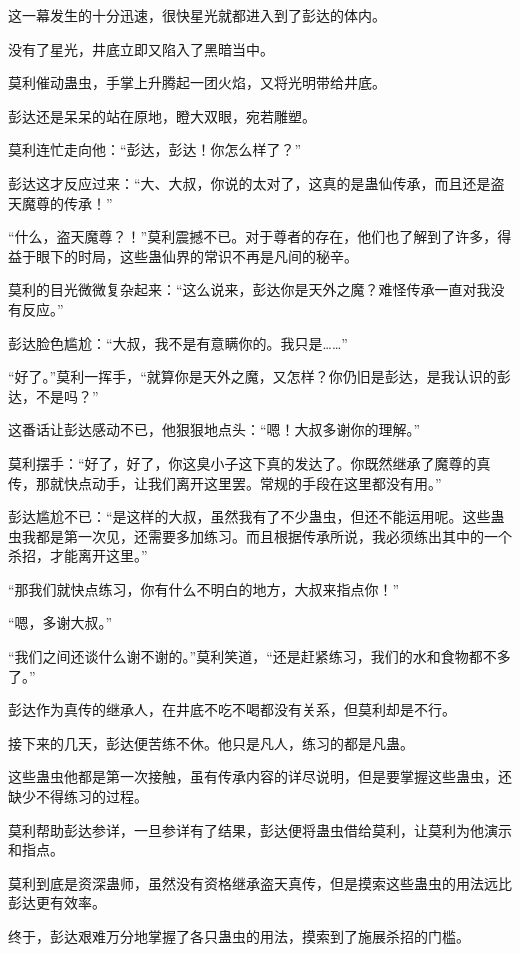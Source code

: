 \begin{this_body}
这一幕发生的十分迅速，很快星光就都进入到了彭达的体内。

没有了星光，井底立即又陷入了黑暗当中。

莫利催动蛊虫，手掌上升腾起一团火焰，又将光明带给井底。

彭达还是呆呆的站在原地，瞪大双眼，宛若雕塑。

莫利连忙走向他：“彭达，彭达！你怎么样了？”

彭达这才反应过来：“大、大叔，你说的太对了，这真的是蛊仙传承，而且还是盗天魔尊的传承！”

“什么，盗天魔尊？！”莫利震撼不已。对于尊者的存在，他们也了解到了许多，得益于眼下的时局，这些蛊仙界的常识不再是凡间的秘辛。

莫利的目光微微复杂起来：“这么说来，彭达你是天外之魔？难怪传承一直对我没有反应。”

彭达脸色尴尬：“大叔，我不是有意瞒你的。我只是……”

“好了。”莫利一挥手，“就算你是天外之魔，又怎样？你仍旧是彭达，是我认识的彭达，不是吗？”

这番话让彭达感动不已，他狠狠地点头：“嗯！大叔多谢你的理解。”

莫利摆手：“好了，好了，你这臭小子这下真的发达了。你既然继承了魔尊的真传，那就快点动手，让我们离开这里罢。常规的手段在这里都没有用。”

彭达尴尬不已：“是这样的大叔，虽然我有了不少蛊虫，但还不能运用呢。这些蛊虫我都是第一次见，还需要多加练习。而且根据传承所说，我必须练出其中的一个杀招，才能离开这里。”

“那我们就快点练习，你有什么不明白的地方，大叔来指点你！”

“嗯，多谢大叔。”

“我们之间还谈什么谢不谢的。”莫利笑道，“还是赶紧练习，我们的水和食物都不多了。”

彭达作为真传的继承人，在井底不吃不喝都没有关系，但莫利却是不行。

接下来的几天，彭达便苦练不休。他只是凡人，练习的都是凡蛊。

这些蛊虫他都是第一次接触，虽有传承内容的详尽说明，但是要掌握这些蛊虫，还缺少不得练习的过程。

莫利帮助彭达参详，一旦参详有了结果，彭达便将蛊虫借给莫利，让莫利为他演示和指点。

莫利到底是资深蛊师，虽然没有资格继承盗天真传，但是摸索这些蛊虫的用法远比彭达更有效率。

终于，彭达艰难万分地掌握了各只蛊虫的用法，摸索到了施展杀招的门槛。


\end{this_body}
